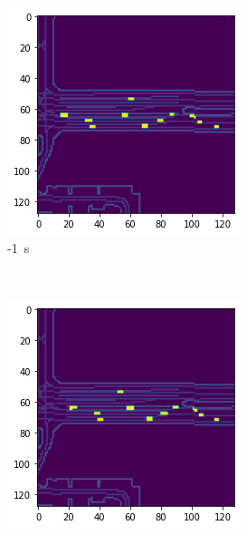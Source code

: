 \documentclass[12pt]{article}
\begin{document}
    \begin{figure}[H]
        \centering
        \begin{subfigure}[b]{0.18\textwidth}
            \includegraphics[width=\textwidth]{output_static_brake_0.png}
            \caption{-1~s}
        \end{subfigure}
        ~
        \begin{subfigure}[b]{0.18\textwidth}
            \includegraphics[width=\textwidth]{output_static_brake_1.png}

\end{subfigure}
\end{figure}
\end{document}
